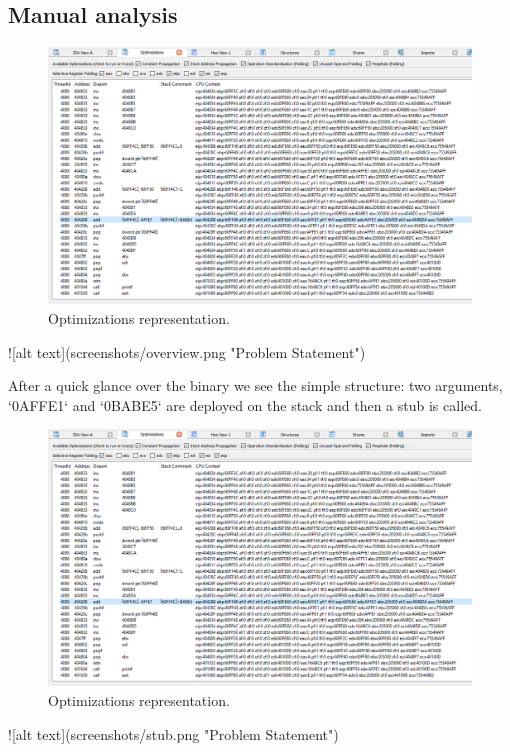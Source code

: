 \documentclass[10pt,twoside,a4paper,bibliography=totoc]{scrbook}
\begin{document}
\subsection{Manual analysis}
\begin{figure}[htp]
\centering
\includegraphics[scale=0.55]{images/ch3/optimizations_success.png}
\caption{Optimizations representation.}
\label{opti_add_success}
\end{figure}
![alt text](screenshots/overview.png "Problem Statement")

After a quick glance over the binary we see the simple structure: two arguments, `0AFFE1` and `0BABE5` are deployed on the stack and then a stub is called.
 
 \begin{figure}[htp]
\centering
\includegraphics[scale=0.55]{images/ch3/optimizations_success.png}
\caption{Optimizations representation.}
\label{opti_add_success}
\end{figure}
![alt text](screenshots/stub.png "Problem Statement")
 
\end{document}
